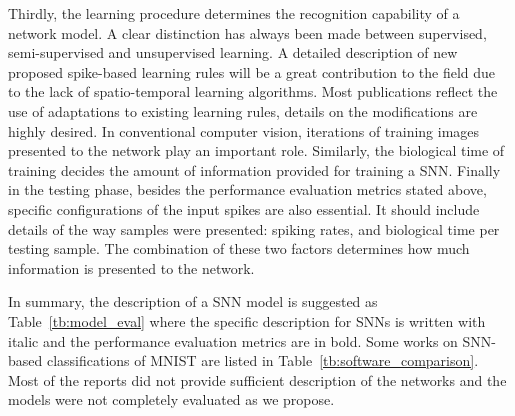 \documentclass{frontiersENG} %
\begin{document}
Thirdly, the learning procedure determines the recognition capability of a network model.
A clear distinction has always been made between supervised, semi-supervised and unsupervised learning.
A detailed description of new proposed spike-based learning rules will be a great contribution to the field due to the lack of spatio-temporal learning algorithms.
Most publications reflect the use of adaptations to existing learning rules, details on the modifications are highly desired.
In conventional computer vision, iterations of training images presented to the network play an important role.
Similarly, the biological time of training decides the amount of information provided for training a SNN.
Finally in the testing phase, besides the performance evaluation metrics stated above, specific configurations of the input spikes are also essential.
It should include details of the way samples were presented: spiking rates, and biological time per testing sample.
The combination of these two factors determines how much information is presented to the network.

In summary, the description of a SNN model is suggested as Table~\ref{tb:model_eval} where the specific description for SNNs is written with italic and the performance evaluation metrics are in bold.
Some works on SNN-based classifications of MNIST are listed in Table~\ref{tb:software_comparison}.
Most of the reports did not provide sufficient description of the networks and the models were not completely evaluated as we propose.
\end{document}
